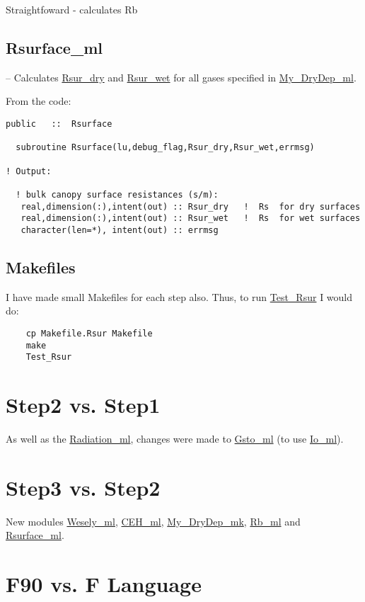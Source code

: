 \documentclass[12pt]{article}
\begin{document}
Straightfoward - calculates Rb



\subsection{Rsurface\_ml}

--  Calculates \url{Rsur_dry} and \url{Rsur_wet} for all gases specified in
\url{My_DryDep_ml}. 

From the code:
\begin{footnotesize}
\begin{verbatim}
public   ::  Rsurface

  subroutine Rsurface(lu,debug_flag,Rsur_dry,Rsur_wet,errmsg) 

! Output:

  ! bulk canopy surface resistances (s/m):
   real,dimension(:),intent(out) :: Rsur_dry   !  Rs  for dry surfaces 
   real,dimension(:),intent(out) :: Rsur_wet   !  Rs  for wet surfaces
   character(len=*), intent(out) :: errmsg
\end{verbatim}
\end{footnotesize}


\subsection{Makefiles}

I have made small Makefiles for each step also. Thus, to run \url{Test_Rsur}
I would do:

\begin{verbatim}
    cp Makefile.Rsur Makefile
    make 
    Test_Rsur
\end{verbatim}


\section{Step2 vs. Step1}

As well as the \url{Radiation_ml}, changes were made to \url{Gsto_ml} 
(to use \url{Io_ml}).

\section{Step3 vs. Step2}

New modules \url{Wesely_ml}, \url{CEH_ml}, \url{My_DryDep_mk}, \url{Rb_ml}
and \url{Rsurface_ml}.

 
\section{F90 vs. F Language}
\end{document}
